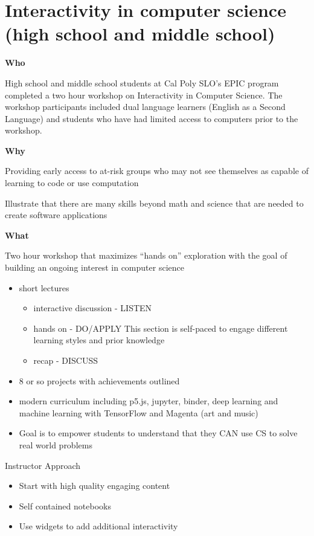 \documentclass[]{book}
\providecommand{\tightlist}{%
  \setlength{\itemsep}{0pt}\setlength{\parskip}{0pt}}
\begin{document}
\hypertarget{interactivity-in-computer-science-high-school-and-middle-school}{%
\section{Interactivity in computer science (high school and middle school)}\label{interactivity-in-computer-science-high-school-and-middle-school}}

\textbf{Who}

High school and middle school students at Cal Poly SLO's EPIC program
completed a two hour workshop on Interactivity in Computer
Science. The workshop participants included dual language learners
(English as a Second Language) and students who have had limited
access to computers prior to the workshop.

\textbf{Why}

Providing early access to at-risk groups who may not see themselves as
capable of learning to code or use computation

Illustrate that there are many skills beyond math and science that are
needed to create software applications

\textbf{What}

Two hour workshop that maximizes ``hands on'' exploration with the goal
of building an ongoing interest in computer science

\begin{itemize}
\tightlist
\item
  short lectures

  \begin{itemize}
  \tightlist
  \item
    interactive discussion - LISTEN
  \item
    hands on - DO/APPLY This section is self-paced to engage different learning styles and prior knowledge
  \item
    recap - DISCUSS
  \end{itemize}
\item
  8 or so projects with achievements outlined
\item
  modern curriculum including p5.js, jupyter, binder, deep learning
  and machine learning with TensorFlow and Magenta (art and music)
\item
  Goal is to empower students to understand that they CAN use CS to
  solve real world problems
\end{itemize}

Instructor Approach

\begin{itemize}
\tightlist
\item
  Start with high quality engaging content
\item
  Self contained notebooks
\item
  Use widgets to add additional interactivity
\end{itemize}
\end{document}
